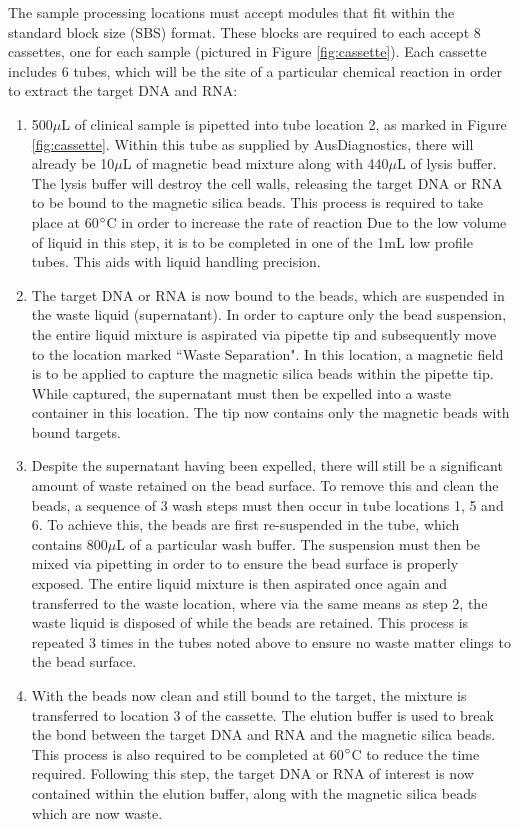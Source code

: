 The sample processing locations must accept modules that fit within the standard block size (SBS) format. These blocks are required to each accept 8 cassettes, one for each sample (pictured in Figure \ref{fig:cassette}). Each cassette includes 6 tubes, which will be the site of a particular chemical reaction in order to extract the target DNA and RNA:
\begin{enumerate}
	\item 500$\mu$L of clinical sample is pipetted into tube location 2, as marked in Figure \ref{fig:cassette}. Within this tube as supplied by AusDiagnostics, there will already be 10$\mu$L of magnetic bead mixture along with 440$\mu$L of lysis buffer. The lysis buffer will destroy the cell walls, releasing the target DNA or RNA to be bound to the magnetic silica beads. This process is required to take place at 60$\degree$C in order to increase the rate of reaction Due to the low volume of liquid in this step, it is to be completed in one of the 1mL low profile tubes. This aids with liquid handling precision.
	\item The target DNA or RNA is now bound to the beads, which are suspended in the waste liquid (supernatant). In order to capture only the bead suspension, the entire liquid mixture is aspirated via pipette tip and subsequently move to the location marked ``Waste Separation". In this location, a magnetic field is to be applied to capture the magnetic silica beads within the pipette tip. While captured, the supernatant must then be expelled into a waste container in this location. The tip now contains only the magnetic beads with bound targets.
	\item Despite the supernatant having been expelled, there will still be a significant amount of waste retained on the bead surface. To remove this and clean the beads, a sequence of 3 wash steps must then occur in tube locations 1, 5 and 6. To achieve this, the beads are first re-suspended in the tube, which contains 800$\mu$L of a particular wash buffer. The suspension must then be mixed via pipetting in order to to ensure the bead surface is properly exposed. The entire liquid mixture is then aspirated once again and transferred to the waste location, where via the same means as step 2, the waste liquid is disposed of while the beads are retained. This process is repeated 3 times in the tubes noted above to ensure no waste matter clings to the bead surface.
	\item With the beads now clean and still bound to the target, the mixture is transferred to location 3 of the cassette. The elution buffer is used to break the bond between the target DNA and RNA and the magnetic silica beads. This process is also required to be completed at 60$\degree$C to reduce the time required. Following this step, the target DNA or RNA of interest is now contained within the elution buffer, along with the magnetic silica beads which are now waste.

\end{enumerate}
